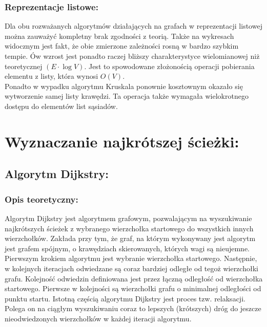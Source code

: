 \documentclass[a4paper,12pt]{article}
\begin{document}
\subsubsection{Reprezentacje listowe:}
Dla obu rozważanych algorytmów działających na grafach w reprezentacji listowej można zauważyć kompletny brak zgodności z teorią. Także na wykresach widocznym jest fakt, że obie zmierzone zależności rosną w bardzo szybkim tempie. Ów wzrost jest ponadto raczej bliższy charakterystyce wielomianowej niż teoretycznej $(E \cdot \log V)$. Jest to spowodowane złożonością operacji pobierania elementu z listy, która wynosi $O(V)$.\\

\noindent
Ponadto w wypadku algorytmu Kruskala ponownie kosztownym okazało się wytworzenie samej listy krawędzi. Ta operacja także wymagała wielokrotnego dostępu do elementów list sąsiadów.

\section{Wyznaczanie najkrótszej ścieżki:}

\subsection{Algorytm Dijkstry:}

\subsubsection{Opis teoretyczny:}
Algorytm Dijkstry jest algorytmem grafowym, pozwalającym na wyszukiwanie najkrótszych ścieżek z wybranego wierzchołka startowego do wszystkich innych wierzchołków. Zakłada przy tym, że graf, na którym wykonywany jest algorytm jest grafem spójnym, o krawędziach skierowanych, których wagi są nieujemne.\\

\noindent
Pierwszym krokiem algorytmu jest wybranie wierzchołka startowego. Następnie, w kolejnych iteracjach odwiedzane są coraz bardziej odległe od tegoż wierzchołki grafu. Kolejność odwiedzin definiowana jest przez łączną odległość od wierzchołka startowego. Pierwsze w kolejności są wierzchołki grafu o minimalnej odległości od punktu startu. Istotną częścią algorytmu Dijkstry jest proces tzw. relaksacji. Polega on na ciągłym wyszukiwaniu coraz to lepszych (krótszych) dróg do jeszcze nieodwiedzonych wierzchołków w każdej iteracji algorytmu.\\
\end{document}
